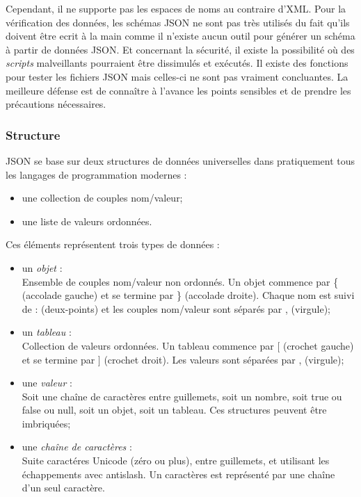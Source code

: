 Cependant, il ne supporte pas les espaces de noms au contraire d'XML.
Pour la v\'erification des donn\'ees, les sch\'emas JSON ne sont pas tr\`es utilis\'es du fait qu'ils doivent \^etre ecrit \`a la main comme il n'existe aucun outil pour g\'en\'erer un sch\'ema \`a partir de donn\'ees JSON.
Et concernant la s\'ecurit\'e, il existe la possibilit\'e o\`u des \textit{scripts} malveillants pourraient \^etre dissimul\'es et ex\'ecut\'es.
Il existe des fonctions pour tester les fichiers JSON mais celles-ci ne sont pas vraiment concluantes.
La meilleure d\'efense est de conna\^itre \`a l'avance les points sensibles et de prendre les pr\'ecautions n\'ecessaires.

\subsubsection{Structure}

JSON se base sur deux structures de donn\'ees universelles dans pratiquement tous les langages de programmation modernes :

\begin{itemize}
	\item une collection de couples nom/valeur;
	\item une liste de valeurs ordonn\'ees.

\end{itemize}

\vspace{0.20cm}

\noindent Ces \'el\'ements repr\'esentent trois types de donn\'ees :

\begin{itemize}
	\item un \textit{objet} :\\Ensemble de couples nom/valeur non ordonn\'es. Un objet commence par \textsf{\{ (accolade gauche)} et se termine par \textsf{\} (accolade droite)}.
	Chaque nom est suivi de \textsf{: (deux-points)} et les couples nom/valeur sont s\'epar\'es par \textsf{, (virgule)};
	\item un \textit{tableau} :\\Collection de valeurs ordonn\'ees. Un tableau commence par \textsf{$[$ (crochet gauche)} et se termine par \textsf{$]$ (crochet droit)}.
	Les valeurs sont s\'epar\'ees par \textsf{, (virgule)};
	\item une \textit{valeur} :\\Soit une \textsf{cha\^ine de caract\`eres} entre guillemets, soit un \textsf{nombre}, soit \textsf{true} ou \textsf{false} ou \textsf{null}, soit un \textsf{objet}, soit un \textsf{tableau}.
	Ces structures peuvent \^etre imbriqu\'ees;
	\item une \textit{cha\^ine de caract\`eres} :\\Suite caract\'eres Unicode (z\'ero ou plus), entre guillemets, et utilisant les \'echappements avec antislash. 
	Un caract\`eres est repr\'esent\'e par une cha\^ine d'un seul caract\`ere.

\end{itemize}


